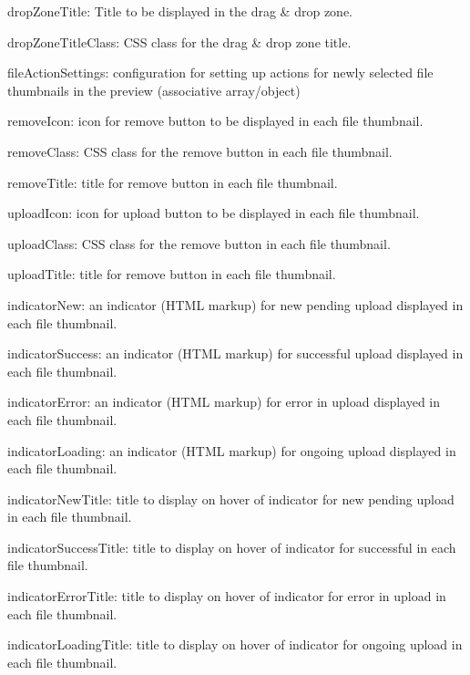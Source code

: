 \begin{DoxyItemize}
\item {\ttfamily drop\+Zone\+Title}\+: Title to be displayed in the drag \& drop zone.
\item {\ttfamily drop\+Zone\+Title\+Class}\+: C\+SS class for the drag \& drop zone title.
\item {\ttfamily file\+Action\+Settings}\+: configuration for setting up actions for newly selected file thumbnails in the preview (associative array/object)
\begin{DoxyItemize}
\item {\ttfamily remove\+Icon}\+: icon for remove button to be displayed in each file thumbnail.
\item {\ttfamily remove\+Class}\+: C\+SS class for the remove button in each file thumbnail.
\item {\ttfamily remove\+Title}\+: title for remove button in each file thumbnail.
\item {\ttfamily upload\+Icon}\+: icon for upload button to be displayed in each file thumbnail.
\item {\ttfamily upload\+Class}\+: C\+SS class for the remove button in each file thumbnail.
\item {\ttfamily upload\+Title}\+: title for remove button in each file thumbnail.
\item {\ttfamily indicator\+New}\+: an indicator (H\+T\+ML markup) for new pending upload displayed in each file thumbnail.
\item {\ttfamily indicator\+Success}\+: an indicator (H\+T\+ML markup) for successful upload displayed in each file thumbnail.
\item {\ttfamily indicator\+Error}\+: an indicator (H\+T\+ML markup) for error in upload displayed in each file thumbnail.
\item {\ttfamily indicator\+Loading}\+: an indicator (H\+T\+ML markup) for ongoing upload displayed in each file thumbnail.
\item {\ttfamily indicator\+New\+Title}\+: title to display on hover of indicator for new pending upload in each file thumbnail.
\item {\ttfamily indicator\+Success\+Title}\+: title to display on hover of indicator for successful in each file thumbnail.
\item {\ttfamily indicator\+Error\+Title}\+: title to display on hover of indicator for error in upload in each file thumbnail.
\item {\ttfamily indicator\+Loading\+Title}\+: title to display on hover of indicator for ongoing upload in each file thumbnail.
\end{DoxyItemize}
\end{DoxyItemize}

